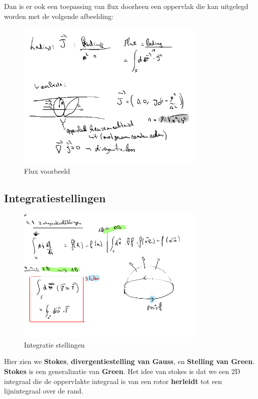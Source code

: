 \documentclass[a4paper]{report}
\begin{document}
Dan is er ook een toepassing van flux doorheen een oppervlak die kan uitgelegd worden met de volgende afbeelding:


\begin{figure}[H]
	\centering
	\includegraphics[width=0.8\textwidth]{assets/flux_voorbeeld.png}
	\caption{Flux voorbeeld}
	\label{fig:flux_voorbeeld}
\end{figure}

\subsection{Integratiestellingen}

\begin{figure}[H]
	\centering
	\includegraphics[width=0.8\textwidth]{assets/IntegratieStellingen.png}
	\caption{Integratie stellingen}
	\label{fig:integratiestellingen}
\end{figure}


Hier zien we \textbf{Stokes}, \textbf{divergentiestelling van Gauss}, en \textbf{Stelling van Green}. \textbf{Stokes} is een generalizatie van \textbf{Green}. Het idee van stokes is dat we een 2D integraal die de oppervlakte integraal is van een rotor \textbf{herleidt} tot een lijnintegraal over de rand.
\end{document}
